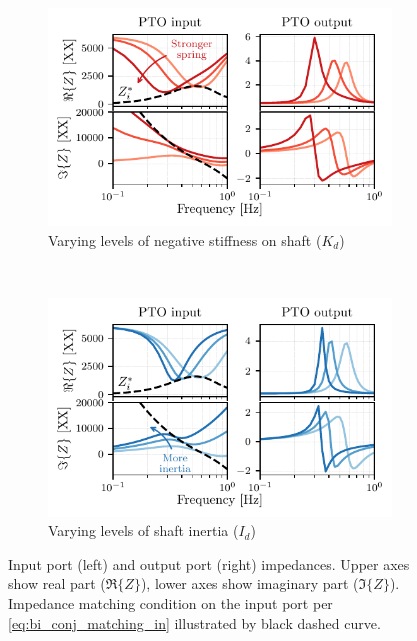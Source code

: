 \documentclass[lettersize,journal]{IEEEtran}
\begin{document}
\begin{figure}
     \centering
     \begin{subfigure}[b]{1\columnwidth}
         \centering
         \includegraphics[width=\textwidth]{wec_as_multiport_in_and_out_impedances_spring.pdf}
         \caption{Varying levels of negative stiffness on shaft ($K_d$)}
         \label{fig:wec_as_multiport_in_and_out_impedances_spring}
     \end{subfigure}
     \\
     \begin{subfigure}[b]{1\columnwidth}
         \centering
         \includegraphics[width=\textwidth]{wec_as_multiport_in_and_out_impedances_inertia.pdf}
         \caption{Varying levels of shaft inertia ($I_d$)}
         \label{fig:wec_as_multiport_in_and_out_impedances_inertia}
     \end{subfigure}
     \caption{Input port (left) and output port (right) impedances. Upper axes show real part ($\Re \{ Z \}$), lower axes show imaginary part ($\Im \{ Z \}$). Impedance matching condition on the input port per \eqref{eq:bi_conj_matching_in} illustrated by black dashed curve.}
     \label{fig:wec_as_multiport_in_and_out_impedances}
\end{figure}
\end{document}
